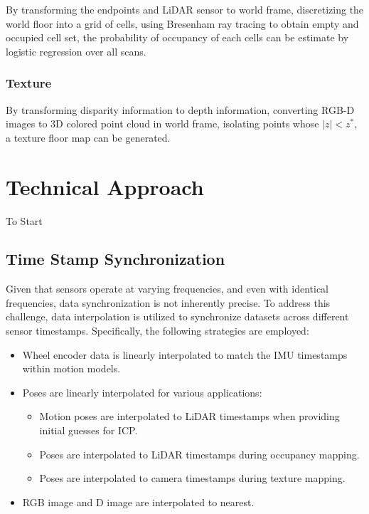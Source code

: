 \documentclass[conference]{IEEEtran}
\begin{document}
By transforming the endpoints and LiDAR sensor to world frame,
discretizing the world floor into a grid of cells,
using Bresenham ray tracing to obtain empty and occupied cell set,
the probability of occupancy of each cells can be estimate by
logistic regression over all scans.

\subsubsection{Texture}
By transforming disparity information to depth information,
converting RGB-D images to 3D colored point cloud in world frame,
isolating points whose $|z| < z^*$,
a texture floor map can be generated.

\section{Technical Approach}
To Start
\subsection{Time Stamp Synchronization}
Given that sensors operate at varying frequencies, 
and even with identical frequencies, 
data synchronization is not inherently precise. 
To address this challenge, data interpolation is utilized to synchronize datasets 
across different sensor timestamps.
Specifically, the following strategies are employed:
\begin{itemize}
\item Wheel encoder data is linearly interpolated to match the IMU timestamps within motion models. 
\item Poses are linearly interpolated for various applications:
\begin{itemize}
\item Motion poses are interpolated to LiDAR timestamps when providing initial guesses for ICP.
\item Poses are interpolated to LiDAR timestamps during occupancy mapping.
\item Poses are interpolated to camera timestamps during texture mapping.
\end{itemize}
\item RGB image and D image are interpolated to nearest.
\end{itemize}
\end{document}
